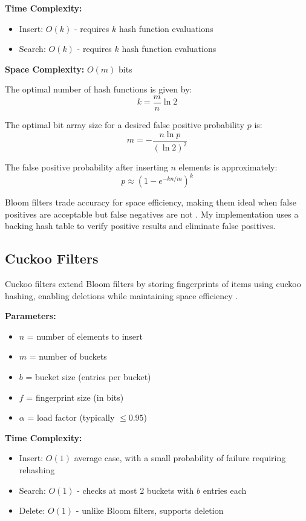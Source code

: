\textbf{Time Complexity:}
\begin{itemize}
    \item Insert: $O(k)$ - requires $k$ hash function evaluations
    \item Search: $O(k)$ - requires $k$ hash function evaluations
\end{itemize}

\textbf{Space Complexity:} $O(m)$ bits

The optimal number of hash functions is given by:
\begin{equation}
k = \frac{m}{n} \ln 2
\end{equation}

The optimal bit array size for a desired false positive probability $p$ is:
\begin{equation}
m = -\frac{n \ln p}{(\ln 2)^2}
\end{equation}

The false positive probability after inserting $n$ elements is approximately:
\begin{equation}
p \approx \left(1 - e^{-kn/m}\right)^k
\end{equation}

Bloom filters trade accuracy for space efficiency, making them ideal when false positives are acceptable but false negatives are not \cite{broder2004network}. My implementation uses a backing hash table to verify positive results and eliminate false positives.

\subsection{Cuckoo Filters}

Cuckoo filters extend Bloom filters by storing fingerprints of items using cuckoo hashing, enabling deletions while maintaining space efficiency \cite{fan2014cuckoo}.

\textbf{Parameters:}
\begin{itemize}
    \item $n$ = number of elements to insert
    \item $m$ = number of buckets
    \item $b$ = bucket size (entries per bucket)
    \item $f$ = fingerprint size (in bits)
    \item $\alpha$ = load factor (typically $\leq 0.95$)
\end{itemize}

\textbf{Time Complexity:}
\begin{itemize}
    \item Insert: $O(1)$ average case, with a small probability of failure requiring rehashing
    \item Search: $O(1)$ - checks at most 2 buckets with $b$ entries each
    \item Delete: $O(1)$ - unlike Bloom filters, supports deletion
\end{itemize}

